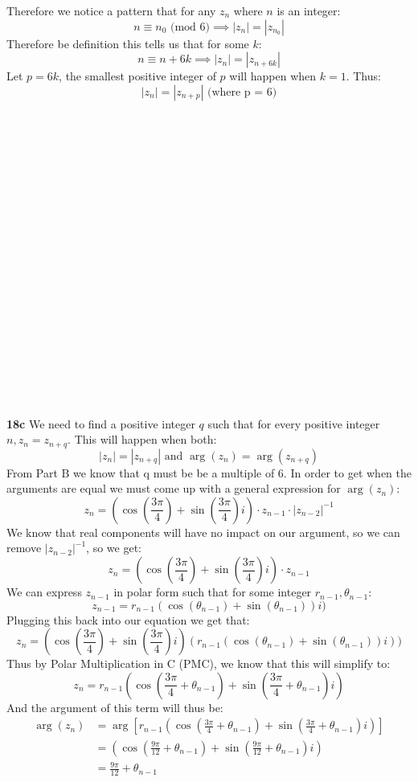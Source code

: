 \documentclass[11pt]{article}
\begin{document}
Therefore we notice a pattern that for any $z_n$ where $n$ is an integer:
\[ n \equiv n_0 \text{ (mod 6)} \implies  |z_n| = |z_{n_0}| \]
Therefore be definition this tells us that for some $k$:
\[ n \equiv n + 6k \implies  |z_n| = |z_{n+6k}|\]
Let $p = 6k$, the smallest positive integer of $p$ will happen when $k = 1$. Thus:
\[ |z_n| = |z_{n+ p}| \text{ (where p = 6)} \]
\\\\\\\\\\\\\\\\\\\\\\\\\\\\\\\\\\\\\\\\
\textbf{18c} We need to find a positive integer $q$ such that for every positive integer $n, z_n =  z_{n+q}$. This will happen when both:
\[ |z_n| = |z_{n+q}| \text{ and } \arg(z_n) = \arg(z_{n+q}) \]
From Part B we know that q must be be a multiple of 6. In order to get when the arguments are equal we must come up with a general expression for $\arg(z_n)$:
\[ z_n = (\cos(\frac{3\pi}{4}) + \sin(\frac{3\pi}{4})i) \cdot z_{n-1} \cdot |z_{n-2}|^{-1} \]
We know that real components will have no impact on our argument, so we can remove $|z_{n-2}|^{-1}$, so we get:
\[ z_n = (\cos(\frac{3\pi}{4}) + \sin(\frac{3\pi}{4})i) \cdot z_{n-1} \]
We can express $z_{n-1}$ in polar form such that for some integer $r_{n-1},\theta_{n-1}$:
\[ z_{n-1} = r_{n-1}(\cos(\theta_{n-1}) + \sin(\theta_{n-1}))i) \]
Plugging this back into our equation we get that:
\[ z_n = (\cos(\frac{3\pi}{4}) + \sin(\frac{3\pi}{4})i) (r_{n-1}(\cos(\theta_{n-1}) + \sin(\theta_{n-1}))i)) \]
Thus by Polar Multiplication in C (PMC), we know that this will simplify to:
\[ z_n = r_{n-1}(\cos(\frac{3\pi}{4} +\theta_{n-1}) + \sin(\frac{3\pi}{4} + \theta_{n-1})i)  \]
And the argument of this term will thus be:
\begin{align*}
 \arg(z_n)  &= \arg[r_{n-1}(\cos(\frac{3\pi}{4} +\theta_{n-1}) + \sin(\frac{3\pi}{4} + \theta_{n-1})i)]  \\
&=  (\cos(\frac{9\pi}{12} +\theta_{n-1}) + \sin(\frac{9\pi}{12} + \theta_{n-1})i)\\
&=  \frac{9\pi}{12} +\theta_{n-1}
\end{align*}
\end{document}
